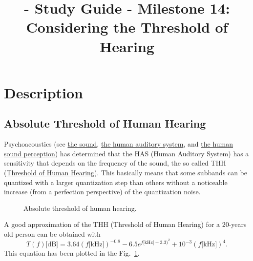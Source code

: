
\title{\TM{} - Study Guide - Milestone 14: Considering the Threshold of Hearing}

\maketitle

\section{Description}

\subsection{Absolute Threshold of Human Hearing}
Psychoacoustics (see
\href{https://vicente-gonzalez-ruiz.github.io/the_sound/}{the sound},
\href{https://vicente-gonzalez-ruiz.github.io/human_auditory_system/}{the
  human auditory system}, and
\href{https://vicente-gonzalez-ruiz.github.io/human_sound_perception/}{the
  human sound perception}) has determined that the HAS (Human Auditory
System) has a sensitivity that depends on the frequency of the sound,
the so called THH
(\href{https://en.wikipedia.org/wiki/Absolute_threshold_of_hearing}{Threshold
  of Human Hearing}). This basically means that some subbands can be
quantized with a larger quantization step than others without a
noticeable increase (from a perfection perspective) of the
quantization noise.

\begin{figure}
  \centering
  \caption{Absolute threshold of human hearing.}
  \label{fig:ToHH}
\end{figure}

A good approximation of the THH (Threshold of Human Hearing) for a 20-years old person can be
obtained with~\cite{bosi2003intro}
\begin{equation}
  T(f)\text{[dB]} = 3.64(f\text{[kHz]})^{-0.8} - 6.5e^{f\text{[kHz]}-3.3)^2} + 10^{-3}(f\text{[kHz]})^4.
  \label{eq:ToHH}
\end{equation}
This equation has been plotted in the Fig.~\ref{fig:ToHH}.

